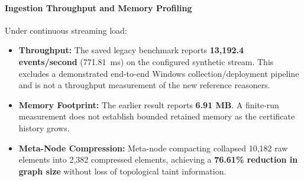 \paragraph{Ingestion Throughput and Memory Profiling}
Under continuous streaming load:
\begin{itemize}
    \item \textbf{Throughput:} The saved legacy benchmark reports \textbf{13,192.4 events/second} (771.81~ms) on the configured synthetic stream. This excludes a demonstrated end-to-end Windows collection/deployment pipeline and is not a throughput measurement of the new reference reasoners.
    \item \textbf{Memory Footprint:} The earlier result reports \textbf{6.91 MB}. A finite-run measurement does not establish bounded retained memory as the certificate history grows.
    \item \textbf{Meta-Node Compression:} Meta-node compacting collapsed 10,182 raw elements into 2,382 compressed elements, achieving a \textbf{76.61\% reduction in graph size} without loss of topological taint information.
\end{itemize}

